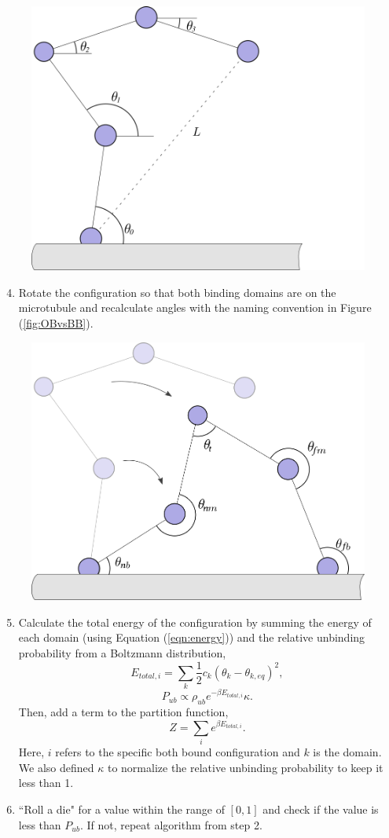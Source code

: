 \begin{figure}[H]
\centering
\includegraphics[width=0.5\columnwidth]{Figures/montecarlo2.png}
\label{fig:mc2}
\end{figure}

\begin{enumerate}
	\setcounter{enumi}{3}
	\item Rotate the configuration so that both binding domains are on the microtubule and recalculate angles with the naming convention in Figure (\ref{fig:OBvsBB}).
\end{enumerate}

\begin{figure}[H]
\centering
\includegraphics[width=0.5\columnwidth]{Figures/montecarlo3.png}
\label{fig:mc3}
\end{figure}

\begin{enumerate}
	\setcounter{enumi}{4}
	\item Calculate the total energy of the configuration by summing the energy of each domain (using Equation (\ref{eqn:energy})) and the relative unbinding probability from a Boltzmann distribution,
	\begin{equation}
		E_{total, i}=\sum_{k}\frac{1}{2}c_k(\theta_k-\theta_{k,eq})^2,
	\end{equation}
	\begin{equation}
		P_{ub} \propto \rho_{ub}e^{-\beta E_{total, i}}\kappa.
	\end{equation}
	Then, add a term to the partition function,
	\begin{equation}
		Z=\sum_{i}e^{\beta E_{total, i}}.
	\end{equation}
	Here, $i$ refers to the specific both bound configuration and $k$ is the domain. We also defined $\kappa$ to normalize the relative unbinding probability to keep it less than 1. 
	
	\item ``Roll a die" for a value within the range of $[0,1]$ and check if the value is less than $P_{ub}$. If not, repeat algorithm from step 2.
\end{enumerate}

